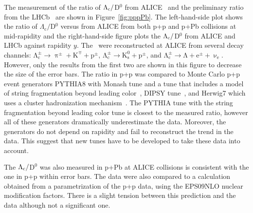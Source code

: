 The measurement of the ratio of ${\Lambda_\text{c}}/$D$^0$ from ALICE~\cite{AliceLcPPPPb} and the preliminary ratio from the LHCb~\cite{LHCbPrompt, LHCbPrivate} are shown in Figure~\ref{fig:pppPb}. The left-hand-side plot shows the ratio of $\Lambda_\mathrm{c}/$D$^0$ versus \pt\@ from ALICE from both p+p and p+Pb collisions at mid-rapidity and the right-hand-side figure plots the ${\Lambda_\text{c}}/$D$^0$ from ALICE and LHCb against rapidity $y$\@. The \Lambdac\ were reconstructed at ALICE from several decay channels: $\mathrm{\Lambda_c^\pm \rightarrow \uppi^\pm + K^\mp + p^\pm}$, $\mathrm{\Lambda_c^\pm \rightarrow K^0_s + p^\pm}$, and $\mathrm{\Lambda_c^\pm \rightarrow \Lambda + e^\pm + \upnu_e}$. However, only the results from the first two are shown in this figure to decrease the size of the error bars.  The ratio in p+p was compared to Monte Carlo p+p event generators PYTHIA8 with Monash tune and a tune that includes a model of string fragmentation beyond leading color~\cite{PYTHIA8strings}, DIPSY tune~\cite{DIPSY}, and Herwig7 which uses a cluster hadronization mechanism~\cite{HERWIG}\@. The PYTHIA tune with the string fragmentation beyond leading color tune is closest to the measured ratio, however all of these generators dramatically underestimate the data. Moreover, the generators do not depend on rapidity and fail to reconstruct the trend in the data. This suggest that new tunes have to be developed to take these data into account.

The ${\Lambda_\text{c}}/$D$^0$ was also measured in p+Pb at ALICE collisions is consistent with the one in p+p within error bars. The data were also compared to a calculation~\cite{LandbergShao} obtained from a parametrization of the p+p data, using the EPS09NLO nuclear modification factors. There is a slight tension between this prediction and the data although not a significant one.




% 


